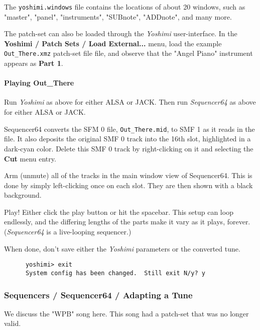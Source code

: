    The \texttt{yoshimi.windows} file contains the locations of about 20
   windows, such as "master", "panel", "instruments", "SUBnote", "ADDnote",
   and many more.

   The patch-set can also be loaded through the \textsl{Yoshimi}
   user-interface.
   In the \textbf{Yoshimi / Patch Sets / Load External...} menu, load the
   example \texttt{Out\_There.xmz} patch-set file file, and observe that
   the "Angel Piano" instrument appears as \textbf{Part 1}.

\paragraph{Playing Out\_There}
\label{paragraph:yoshimi_playing_out_there}

   Run \textsl{Yoshimi} as above for either ALSA or JACK.
   Then run \textsl{Sequencer64} as above for either ALSA or JACK.

   Sequencer64 converts the SFM 0 file, \texttt{Out\_There.mid},
   to SMF 1 as it reads in the file.
   It also deposits the original SMF 0 track into the 16th slot, highlighted in
   a dark-cyan color.
   Delete this SMF 0 track by right-clicking on it and selecting the
   \textbf{Cut} menu entry.

   Arm (unmute) all of the tracks in the main window view of Sequencer64.
   This is done by simply left-clicking once on each slot.
   They are then shown with a black background.

   Play!  Either click the play button or hit the spacebar.
   This setup can loop endlessly, and the differing lengths of the parts
   make it vary as it plays, forever.  (\textsl{Sequencer64} is a live-looping
   sequencer.)

   When done, don't save either the \textsl{Yoshimi} parameters or the
   converted tune.

   \begin{verbatim}
      yoshimi> exit
      System config has been changed.  Still exit N/y? y
   \end{verbatim}

\subsubsection{Sequencers / Sequencer64 / Adapting a Tune}
\label{subsubsec:sequencers_seq64_adapting_a_tune}

   We discuss the "WPB" song here.
   This song had a patch-set that was no longer valid.

